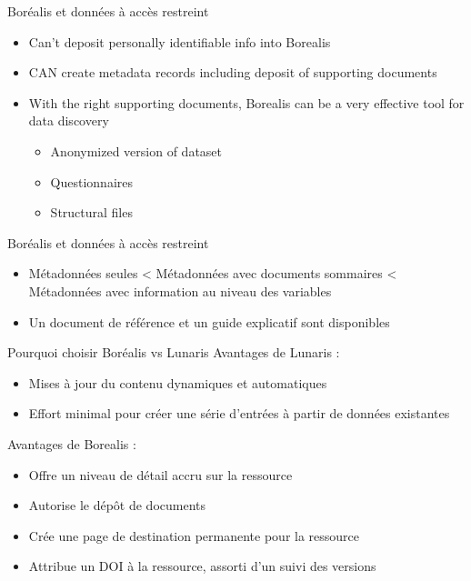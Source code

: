 \documentclass[
  ignorenonframetext,
]{beamer}
\providecommand{\tightlist}{%
  \setlength{\itemsep}{0pt}\setlength{\parskip}{0pt}}
\begin{document}
\begin{frame}{Boréalis et données à accès restreint}
\label{boruxe9alis-et-donnuxe9es-uxe0-accuxe8s-restreint}
\begin{itemize}
\tightlist
\item
  Can't deposit personally identifiable info into Borealis
\item
  CAN create metadata records including deposit of supporting documents
\item
  With the right supporting documents, Borealis can be a very effective
  tool for data discovery

  \begin{itemize}
  \tightlist
  \item
    Anonymized version of dataset
  \item
    Questionnaires
  \item
    Structural files
  \end{itemize}
\end{itemize}
\end{frame}

\begin{frame}{Boréalis et données à accès restreint}
\label{boruxe9alis-et-donnuxe9es-uxe0-accuxe8s-restreint-1}
\begin{itemize}
\tightlist
\item
  Métadonnées seules \textless{} Métadonnées avec documents sommaires
  \textless{} Métadonnées avec information au niveau des variables
\item
  Un document de référence et un guide explicatif sont disponibles
\end{itemize}
\end{frame}

\begin{frame}{Pourquoi choisir Boréalis vs Lunaris}
\label{pourquoi-choisir-boruxe9alis-vs-lunaris}
Avantages de Lunaris :

\begin{itemize}
\tightlist
\item
  Mises à jour du contenu dynamiques et automatiques
\item
  Effort minimal pour créer une série d'entrées à partir de données
  existantes
\end{itemize}

Avantages de Borealis :

\begin{itemize}
\tightlist
\item
  Offre un niveau de détail accru sur la ressource
\item
  Autorise le dépôt de documents
\item
  Crée une page de destination permanente pour la ressource
\item
  Attribue un DOI à la ressource, assorti d'un suivi des versions
\end{itemize}
\end{frame}
\end{document}
